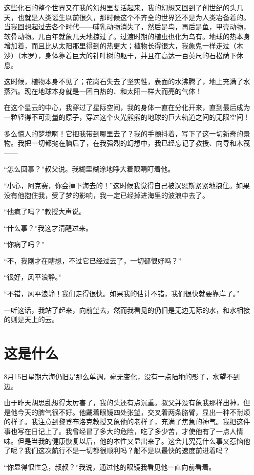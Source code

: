 \documentclass[10pt]{book}
\begin{document}
这些化石的整个世界又在我的幻想里复活起来，我的幻想又回到了创世纪的头几天，也就是人类诞生以前很久，那时候这个不齐全的世界还不是为人类冶备着的。当我回想起过去各个时代——哺乳动物消失了，然后是鸟，再后是鱼，甲壳动物，软骨动物。几百年就象几天地掠过了。过渡时期的植虫也化为乌有。地球的热本身增加着，而且比从太阳那里得到的热更大；植物长得很大，我象鬼一样走过（木沙）（木罗），身体靠着巨大的针叶树的躯干，并且在高达一百英尺的石松荫下休息。

这时候，植物本身不见了；花岗石失去了坚实性，表面的水沸腾了，地上充满了水蒸汽。现在地球本身就是一团白热的、和太阳一样大而亮的气体！

在这个星云的中心，我穿过了星际空间，我的身体一直在分化开来，直到最后成为一粒轻得不可测量的原子，穿过这个火光熊熊的地球的巨大轨道之间的无限空间！

多么惊人的梦境啊！它把我带到哪里去了？我的手颤抖着，写下了这一切新奇的景物。我把一切都抛在脑后了，在我强烈的幻想中，我已经忘记了教授、向导和木筏——

“怎么回事？”叔父说。我糊里糊涂地睁大着限睛盯着他。

“小心，阿克赛，你会掉下海去的！”这时候我觉得自己被汉恩斯紧紧地抱住。如果没有他抱住我，受了梦的影响，我一定已经掉进海里的波浪中去了。

“他疯了吗？”教授大声说。

“什么事？”我这才清醒过来。

“你病了吗？”

“不，我刚才在瞎想，不过它已经过去了，一切都很好吗？”

“很好，风平浪静。”

“不错，风平浪静！我们走得很快。如果我的估计不错，我们很快就要靠岸了。”

一听这话，我站了起来，向前望去，然而我看见的仍旧是无边无际的水，和水相接的则是天上的云。
\chapter{这是什么}
8月15日星期六海仍旧是那么单调，毫无变化，没有一点陆地的影子，水望不到边。

由于昨天胡思乱想得太厉害了，我的头还有点沉重。叔父并没有象我那样出神，但是他今天的脾气很不好。他戴着眼镜四处张望，交叉着两条胳臂，显出一种不耐烦的样子。我注意到黎登布洛克教授又象他的老样子，充满了焦急的神气。我把这件事也写在日记上了。我曾经冒了多大的危险，吃了多少苦，才使他有了一点人情味。但是当我的健康恢复以后，他的本性又显出来了。这会儿究竟什么事又惹恼他了呢？我们这次航行不是一切都很顺利吗？船不是以最快的速度前进着吗？

“你显得很性急，叔叔？”我说，通过他的眼镜我看见他一直向前看着。
\end{document}
